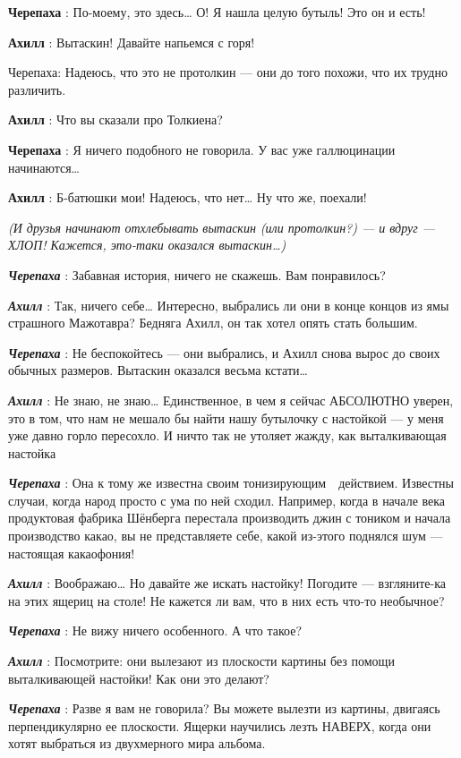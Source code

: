 \textbf{Черепаха} : По-моему, это здесь\ldots{} О! Я нашла целую бутыль! Это он и есть!

\textbf{Ахилл} : Вытаскин! Давайте напьемся с горя!

Черепаха: Надеюсь, что это не протолкин --- они до того похожи, что их трудно различить.

\textbf{Ахилл} : Что вы сказали про Толкиена?

\textbf{Черепаха} : Я ничего подобного не говорила. У вас уже галлюцинации начинаются\ldots{}

\textbf{Ахилл} : Б-батюшки мои! Надеюсь, что нет\ldots{} Ну что же, поехали!

\emph{(И друзья начинают отхлебывать вытаскин (или протолкин?) --- и вдруг --- ХЛОП! Кажется, это-таки оказался вытаскин\ldots)}

\emph{\textbf{Черепаха}} : Забавная история, ничего не скажешь. Вам понравилось?

\emph{\textbf{Ахилл}} : Так, ничего себе\ldots{} Интересно, выбрались ли они в конце концов из ямы страшного Мажотавра? Бедняга Ахилл, он так хотел опять стать большим.

\emph{\textbf{Черепаха}} : Не беспокойтесь --- они выбрались, и Ахилл снова вырос до своих обычных размеров. Вытаскин оказался весьма кстати\ldots{}

\emph{\textbf{Ахилл}} : Не знаю, не знаю\ldots{} Единственное, в чем я сейчас АБСОЛЮТНО уверен, это в том, что нам не мешало бы найти нашу бутылочку с настойкой --- у меня уже давно горло пересохло. И ничто так не утоляет жажду, как выталкивающая настойка

\emph{\textbf{Черепаха}} : Она к тому же известна своим тонизирующим~~действием. Известны случаи, когда народ просто с ума по ней сходил. Например, когда в начале века продуктовая фабрика Шёнберга перестала производить джин с тоником и начала производство какао, вы не представляете себе, какой из-этого поднялся шум --- настоящая какаофония!

\emph{\textbf{Ахилл}} : Воображаю\ldots{} Но давайте же искать настойку! Погодите --- взгляните-ка на этих ящериц на столе! Не кажется ли вам, что в них есть что-то необычное?

\emph{\textbf{Черепаха}} : Не вижу ничего особенного. А что такое?

\emph{\textbf{Ахилл}} : Посмотрите: они вылезают из плоскости картины без помощи выталкивающей настойки! Как они это делают?

\emph{\textbf{Черепаха}} : Разве я вам не говорила? Вы можете вылезти из картины, двигаясь перпендикулярно ее плоскости. Ящерки научились лезть НАВЕРХ, когда они хотят выбраться из двухмерного мира альбома.

